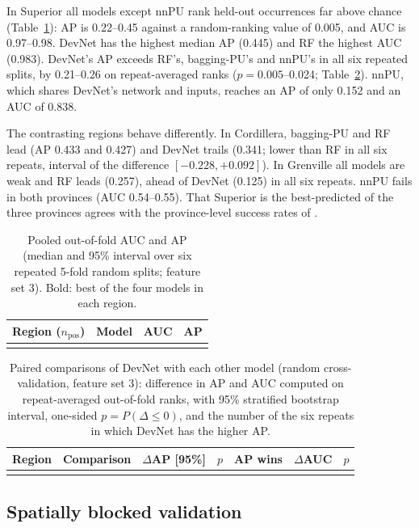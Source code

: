 \documentclass[pdflatex,sn-apa]{sn-jnl}
\begin{document}
In Superior all models except nnPU rank held-out occurrences far above chance (Table~\ref{tab:benchmark}): AP is 0.22--0.45 against a random-ranking value of 0.005, and AUC is 0.97--0.98. DevNet has the highest median AP (0.445) and RF the highest AUC (0.983). DevNet's AP exceeds RF's, bagging-PU's and nnPU's in all six repeated splits, by 0.21--0.26 on repeat-averaged ranks ($p = 0.005$--0.024; Table~\ref{tab:bootstrap}). nnPU, which shares DevNet's network and inputs, reaches an AP of only 0.152 and an AUC of 0.838.

The contrasting regions behave differently. In Cordillera, bagging-PU and RF lead (AP 0.433 and 0.427) and DevNet trails (0.341; lower than RF in all six repeats, interval of the difference $[-0.228, +0.092]$). In Grenville all models are weak and RF leads (0.257), ahead of DevNet (0.125) in all six repeats. nnPU fails in both provinces (AUC 0.54--0.55). That Superior is the best-predicted of the three provinces agrees with the province-level success rates of \citet{Parsa2024}.

\begin{table}[t]
\caption{Pooled out-of-fold AUC and AP (median and 95\% interval over six repeated 5-fold random splits; feature set 3). Bold: best of the four models in each region.}\label{tab:benchmark}
\footnotesize
\begin{tabular*}{\textwidth}{@{\extracolsep\fill}llcc}
\toprule
Region ($n_{\mathrm{pos}}$) & Model & AUC & AP \\
\midrule
\botrule
\end{tabular*}
\end{table}

\begin{table}[t]
\caption{Paired comparisons of DevNet with each other model (random cross-validation, feature set 3): difference in AP and AUC computed on repeat-averaged out-of-fold ranks, with 95\% stratified bootstrap interval, one-sided $p = P(\Delta \leq 0)$, and the number of the six repeats in which DevNet has the higher AP.}\label{tab:bootstrap}
\footnotesize
\setlength{\tabcolsep}{2.5pt}
\begin{tabular*}{\textwidth}{@{\extracolsep\fill}llccccc}
\toprule
Region & Comparison & $\Delta$AP [95\%] & $p$ & AP wins & $\Delta$AUC & $p$ \\
\midrule
\botrule
\end{tabular*}
\end{table}

\subsection{Spatially blocked validation}\label{sec:res-spatial}
\end{document}
